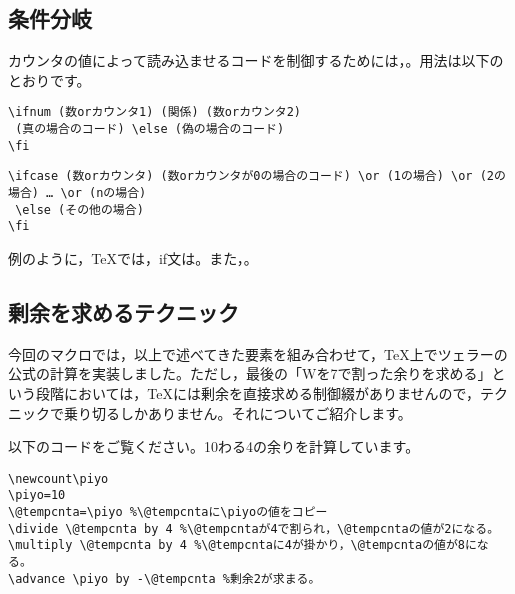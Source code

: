 \documentclass[autodetect-engine,dvipdfmx]{jsarticle}
\begin{document}
\subsection{条件分岐}

カウンタの値によって読み込ませるコードを制御するためには，\verb@{}\verb@{}。用法は以下のとおりです。

\begin{tcolorbox}

\begin{verbatim}
\ifnum (数orカウンタ1) (関係) (数orカウンタ2)
 (真の場合のコード) \else (偽の場合のコード)
\fi
\end{verbatim}

\end{tcolorbox}

\begin{tcolorbox}

\begin{verbatim}
\ifcase (数orカウンタ) (数orカウンタが0の場合のコード) \or (1の場合) \or (2の場合) … \or (nの場合)
 \else (その他の場合)
\fi
\end{verbatim}

\end{tcolorbox}

例のように，\TeX では，if文は\verb@{}。また，\verb@{}。

\subsection{剰余を求めるテクニック}

今回のマクロでは，以上で述べてきた要素を組み合わせて，\TeX 上でツェラーの公式の計算を実装しました。ただし，最後の「Wを7で割った余りを求める」という段階においては，\TeX には剰余を直接求める制御綴がありませんので，テクニックで乗り切るしかありません。それについてご紹介します。

以下のコードをご覧ください。10わる4の余りを計算しています。

\begin{tcolorbox}

\begin{verbatim}
\newcount\piyo
\piyo=10
\@tempcnta=\piyo %\@tempcntaに\piyoの値をコピー
\divide \@tempcnta by 4 %\@tempcntaが4で割られ，\@tempcntaの値が2になる。
\multiply \@tempcnta by 4 %\@tempcntaに4が掛かり，\@tempcntaの値が8になる。
\advance \piyo by -\@tempcnta %剰余2が求まる。
\end{verbatim}

\end{tcolorbox}
\end{document}
